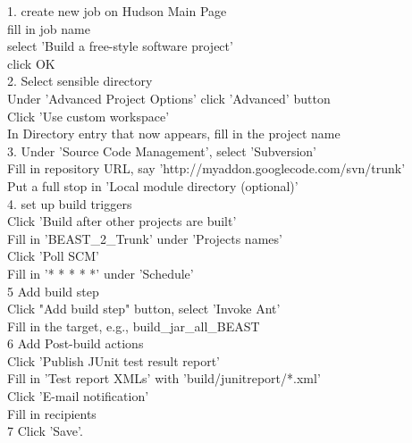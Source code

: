 \documentclass{article}
\begin{document}
1. create new job on Hudson Main Page\\
fill in job name\\
select 'Build a free-style software project'\\
click OK\\
2. Select sensible directory\\
Under 'Advanced Project Options' click 'Advanced' button\\
Click 'Use custom workspace'\\
In Directory entry that now appears, fill in the project name\\
3. Under 'Source Code Management', select 'Subversion'\\
Fill in repository URL, say 'http://myaddon.googlecode.com/svn/trunk'\\
Put a full stop in 'Local module directory (optional)'\\
4. set up build triggers\\
Click 'Build after other projects are built'\\
Fill in 'BEAST\_2\_Trunk' under 'Projects names'\\
Click 'Poll SCM'\\
Fill in '* * * * *' under 'Schedule'\\
5 Add build step\\
Click "Add build step" button, select 'Invoke Ant'\\
Fill in the target, e.g., build\_jar\_all\_BEAST\\
6 Add Post-build actions\\
Click 'Publish JUnit test result report'\\
Fill in 'Test report XMLs' with 'build/junitreport/*.xml'\\
Click 'E-mail notification'\\
Fill in recipients\\
7 Click 'Save'.
\end{document}

